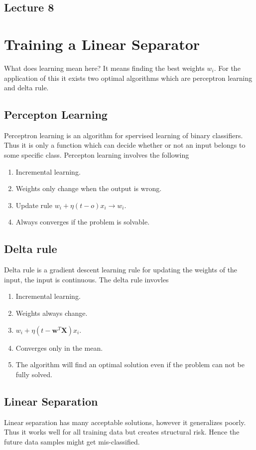 \documentclass[12pt]{article}
\numberwithin{equation}{section}
\begin{document}
\subsection{Lecture 8}
\section{Training a Linear Separator}
What does learning mean here? It means finding the best weights $w_i$. For the application of this it exists two optimal algorithms which are perceptron learning and delta rule.

\subsection{Percepton Learning}
Perceptron learning is an algorithm for spervised learning of binary classifiers. Thus it is only a function which can decide whether or not an input belongs to some specific class. Percepton learning involves the following
\begin{enumerate}
    \item Incremental learning.
    \item Weights only change when the output is wrong.
    \item Update rule $w_i + \eta (t-o)x_i \to w_i$.
    \item Always converges if the problem is solvable.
\end{enumerate}
\subsection{Delta rule}
Delta rule is a gradient descent learning rule for updating the weights of the input, the input is continuous. The delta rule invovles
\begin{enumerate}
    \item Incremental learning.
    \item Weights always change.
    \item $w_i + \eta (t-\bm{w}^T \bm{X})x_i$.
    \item Converges only in the mean.
    \item The algorithm will find an optimal solution even if the problem can not be fully solved.
\end{enumerate}
\subsection{Linear Separation}
Linear separation has many acceptable solutions, however it generalizes poorly. Thus it works well for all training data but creates structural risk. Hence the future data samples might get mis-classified. 
\end{document}
